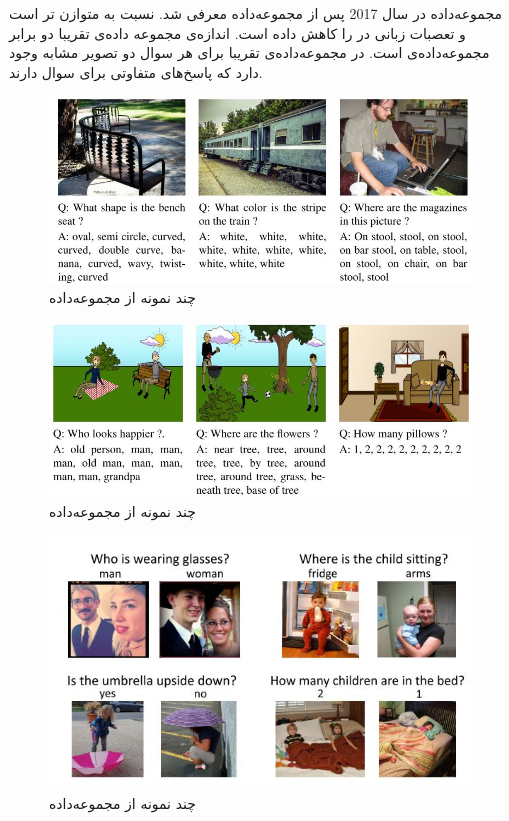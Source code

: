  مجموعه‌داده 
در سال 2017 پس از مجموعه‌داده 
معرفی شد. 
نسبت به 
متوازن تر است و تعصبات زبانی در 
را کاهش داده است. اندازه‌ی مجموعه داده‌ی
تقریبا دو برابر مجموعه‌داده‌ی 
است. در مجموعه‌داده‌ی
تقریبا برای هر سوال دو تصویر مشابه وجود دارد که پاسخ‌های متفاوتی برای سوال دارند.

  \begin{figure}[h]
	\centerline{\includegraphics[scale=0.5]{images/VQA1-real.JPG}}
	\caption{چند نمونه از مجموعه‌داده  \cite{antol2015vqa}}
	\label{fig:vqa1realExample}
  \end{figure}

  \begin{figure}[h]
	\centerline{\includegraphics[scale=0.5]{images/VQA1-abstract.JPG}}
	\caption{چند نمونه از مجموعه‌داده  \cite{antol2015vqa}}
	\label{fig:vqa1abstractExample}
  \end{figure}

  \begin{figure}[h]
	\centerline{\includegraphics[scale=0.6]{images/VQA2.JPG}}
	\caption{چند نمونه از مجموعه‌داده  \cite{goyal2017making}}
	\label{fig:vqa2Example}
  \end{figure}

